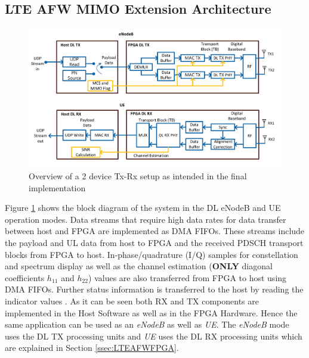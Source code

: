 \subsection{LTE AFW MIMO Extension Architecture}\label{ssec:LTEAFWArch}

\begin{figure}[!htb]
    \centering
    \includegraphics[width=\linewidth]{images/LTEAFW2x2ExtBlockDiagram.png}
    \caption{Overview of a 2 device Tx-Rx setup as intended in the final implementation}
    \label{fig:LTEAFW2DeviceOverview}
\end{figure}

Figure %
\ref{fig:LTEAFW2DeviceOverview} shows the block diagram of the system in the DL eNodeB and UE operation modes. Data streams that require high data rates for data transfer between host and FPGA are implemented as DMA FIFOs. These streams include the payload and UL data from host to FPGA and the received PDSCH transport blocks from FPGA to host. In-phase/quadrature (I/Q) samples for constellation and spectrum display as well as the channel estimation (\textbf{ONLY} diagonal coefficients $h_{11}$ and $h_{22}$) values are also transferred from FPGA to host using DMA FIFOs. Further status information is transferred to the host by reading the indicator values \cite{LTEAFWManual}. As it can be seen both RX and TX components are implemented in the Host Software as well as in the FPGA Hardware. Hence the same application can be used as an \textit{eNodeB} as well as \textit{UE}. The \textit{eNodeB} mode uses the DL TX processing units and \textit{UE} uses the DL RX processing units which are explained in Section \ref{ssec:LTEAFWFPGA}.


